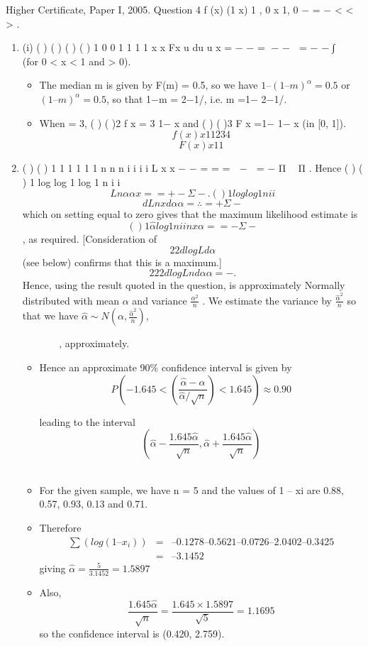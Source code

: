 \documentclass[a4paper,12pt]{article}
\begin{document}
Higher Certificate, Paper I, 2005. Question 4
f (x) (1 x) 1 , 0 x 1, 0 \alpha \alpha \alpha − = − < < > .

\begin{enumerate}
\item (i) ( ) ( ) ( ) ( ) 1
0 0
1 1 1 1
x x Fx u du u x \alpha \alpha \alpha \alpha = − − = − −  = − − ∫   (for 0 < x < 1 and \alpha > 0).

\begin{itemize}
\item The median m is given by F(m) = 0.5, so we have $1 – (1 – m)^\alpha = 0.5$ or $(1 – m)^\alpha = 0.5$,
so that 1−m = 2−1/\alpha , i.e. m =1− 2−1/\alpha .
\item When \alpha = 3, ( ) ( )2 f x = 3 1− x and ( ) ( )3 F x =1− 1− x (in [0, 1]).
\[ f(x)
x
1
1
2
3
4\]
\[ F(x)
x
1
1\]
\end{itemize}
\item ( ) ( ) 1 1
1 1
1 1
n n
n
i i
i i
L x x \alpha \alpha \alpha \alpha − −
= =
=  −  = − Π  Π .
Hence ( ) ( )
1
log log 1 log 1
n
i
i
\[L n \alpha \alpha x
=
= + − Σ − .
( )
1
log log 1
n
i
i\]
\[d L n x
d\alpha \alpha =
∴ = +Σ −\] which on setting equal to zero gives that the maximum
likelihood estimate is
\[( )
1
\hat{\alpha}
log 1
n
i
i
n
x
\alpha
=
= −
Σ −\]
, as required. [Consideration of
\[2
2
d log L
d\alpha\]
(see below) confirms that this is a maximum.]
\[2
2 2
d log L n
d\alpha \alpha
= − . \]Hence, using the result quoted in the question, \alpha\hat{\alpha} is approximately
Normally distributed with mean $\alpha$ and variance
$\frac{\alpha^2}{n}$ . We estimate the variance by
$\frac{\hat{\alpha}^2}{n}$
so that we have
$\hat{\alpha}  \sim N \left(\alpha, \frac{\hat{\alpha}^2}{n} \right)$,

 
 
 
, approximately.

\begin{itemize}
\item Hence an approximate 90\% confidence interval is given by
\[
P\left(-1.645 < \left( \frac{ \hat{\alpha} - \alpha }{ \hat{\alpha} / \sqrt{n} }  \right) < 1.645 \right) \approx 0.90
\]

leading to the interval
\[
\left( \hat{\alpha}  - \frac{1.645 \hat{\alpha}}{\sqrt{n}} , \hat{\alpha} + \frac{1.645 \hat{\alpha}}{\sqrt{n}} \right)
\]
 

\item For the given sample, we have n = 5 and the values of 1 – xi are 0.88, 0.57, 0.93, 0.13
and 0.71. 
\item Therefore
\begin{eqnarray*}
\sum (log(1 – x_i)) &=& –0.1278 – 0.5621 – 0.0726 – 2.0402 – 0.3425 \\ 
&=& –3.1452
\end{eqnarray*}
giving $\hat{\alpha} = \frac{5}{3.1452} = 1.5897$

\item Also,
\[ \frac{1.645 \hat{\alpha}}{\sqrt{n}} = \frac{1.645 \times 1.5897}{\sqrt{5}} = 1.1695\] so the confidence interval is (0.420, 2.759).
\end{itemize}

\end{enumerate}
\end{document}
